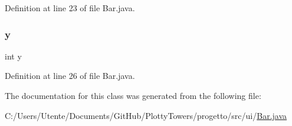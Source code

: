 Definition at line 23 of file Bar.\+java.

\mbox{\label{classui_1_1_bar_a0a2f84ed7838f07779ae24c5a9086d33}} 
\subsubsection{\texorpdfstring{y}{y}}
{\footnotesize\ttfamily int y\hspace{0.3cm}{\ttfamily [protected]}}



Definition at line 26 of file Bar.\+java.



The documentation for this class was generated from the following file\+:\begin{DoxyCompactItemize}
\item 
C\+:/\+Users/\+Utente/\+Documents/\+Git\+Hub/\+Plotty\+Towers/progetto/src/ui/\hyperlink{_bar_8java}{Bar.\+java}\end{DoxyCompactItemize}
